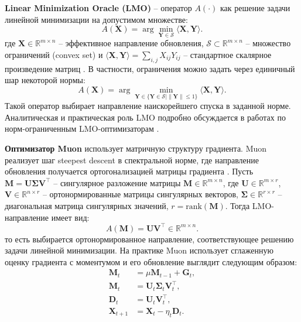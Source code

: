 \documentclass{article}
\begin{document}
\textbf{Linear Minimization Oracle (LMO)} -- оператор $A(\cdot)$ как решение задачи линейной минимизации на допустимом множестве:
\begin{equation}
A(\mathbf{X})=\arg\min_{\mathbf{Y} \in \mathcal{S}}\langle \mathbf{X}, \mathbf{Y}\rangle.
\end{equation}
где $\mathbf{X}\in\mathbb{R}^{m\times n}$ -- эффективное направление обновления, $\mathcal{S}\subset\mathbb{R}^{m\times n}$ -- множество ограничений (convex set) и $\langle \mathbf{X},\mathbf{Y}\rangle=\sum_{i,j}{X}_{ij}{Y}_{ij}$ -- стандартное скалярное произведение матриц \cite{pethick2025training}. В частности, ограничения можно задать через единичный шар некоторой нормы:
\begin{equation}
A(\mathbf{X})=\arg\min_{\mathbf{Y} \in \{ \mathbf{Y} \in \mathcal{S} | \|\mathbf{Y}\| \le1\}}\langle \mathbf{X}, \mathbf{Y}\rangle.
\end{equation}
Такой оператор выбирает направление наискорейшего спуска в заданной норме. Аналитическая и практическая роль LMO подробно обсуждается в работах по норм-ограниченным LMO-оптимизаторам \cite{pethick2025training, kovalev2025understanding, riabinin2025gluon}.

\textbf{Оптимизатор Muon} использует матричную структуру градиента. Muon реализует шаг steepest descent в спектральной норме, где направление обновления получается ортогонализацией матрицы градиента \cite{bernstein2024old}. Пусть $\mathbf{M}=\mathbf{U}\boldsymbol{\Sigma}\mathbf{V}^\top$ -- сингулярное разложение матрицы $\mathbf{M}\in\mathbb{R}^{m\times n}$, где $\mathbf{U}\in\mathbb{R}^{m\times r}$, $\mathbf{V}\in\mathbb{R}^{n\times r}$ -- ортонормированные матрицы сингулярных векторов, $\boldsymbol{\Sigma}\in\mathbb{R}^{r\times r}$ -- диагональная матрица сингулярных значений, $r=\mathrm{rank}(\mathbf{M})$. Тогда LMO-направление имеет вид:
\begin{equation}
A(\mathbf{M})=\mathbf{U}\mathbf{V}^\top \in \mathbb{R}^{m\times n}.
\end{equation}
то есть выбирается ортонормированное направление, соответствующее решению задачи линейной минимизации. На практике Muon использует сглаженную оценку градиента с моментумом и его обновление выглядит следующим образом: 
\begin{equation}
    \begin{aligned}
        \mathbf{M}_t &= \mu \mathbf{M}_{t-1} + \mathbf{G}_t, \\
        \mathbf{M}_t &= \mathbf{U}_t \boldsymbol{\Sigma}_t \mathbf{V}_t^\top, \\
        \mathbf{D}_t &= \mathbf{U}_t \mathbf{V}_t^\top, \\
        \mathbf{X}_{t+1} &= \mathbf{X}_t - \eta_t \mathbf{D}_t.
    \end{aligned}
\end{equation}
\end{document}
